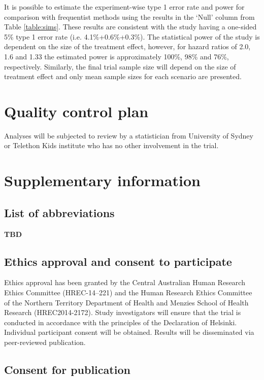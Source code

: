 \documentclass[a4paper]{article}
\begin{document}
It is possible to estimate the experiment-wise type 1 error rate and power for comparison with frequentist methods using the results in the `Null' column from Table \ref{table:sims}.
These results are consistent with the study having a one-sided 5\% type 1 error rate (i.e. 4.1\%+0.6\%+0.3\%).
The statistical power of the study is dependent on the size of the treatment effect, however, for hazard ratios of 2.0, 1.6 and 1.33 the estimated power is approximately 100\%, 98\% and 76\%, respectively. Similarly, the final trial sample size will depend on the size of treatment effect and only mean sample sizes for each scenario are presented.

\section{Quality control plan}

Analyses will be subjected to review by a statistician from University of Sydney or Telethon Kids institute who has no other involvement in the trial.


\section{Supplementary information}

\subsection{List of abbreviations}

\textbf{TBD}


\subsection{Ethics approval and consent to participate}

Ethics approval has been granted by the Central Australian Human Research Ethics Committee (HREC-14–221) and the Human Research Ethics Committee of the Northern Territory Department of Health and Menzies School of Health Research (HREC2014-2172).
Study investigators will ensure that the trial is conducted in accordance with the principles of the Declaration of Helsinki.
Individual participant consent will be obtained.
Results will be disseminated via peer-reviewed publication.

\subsection{Consent for publication}
\end{document}
